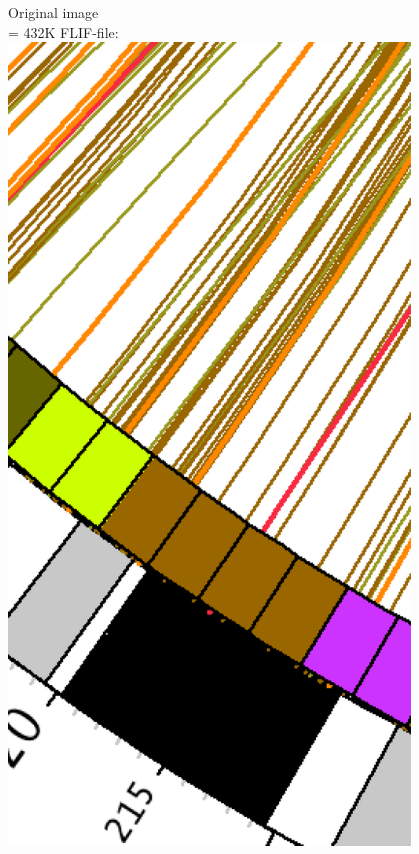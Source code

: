 \documentclass[a4paper,USenglish]{lipics}
\begin{document}
\begin{figure}
\begin{minipage}[b]{0.25\textwidth}
Original image\\
= 432K FLIF-file:\\
\includegraphics[width=0.95\textwidth]{images/c_orig}
\end{minipage}%
\begin{minipage}[b]{0.25\textwidth}

\end{minipage}
\end{figure}
\end{document}
